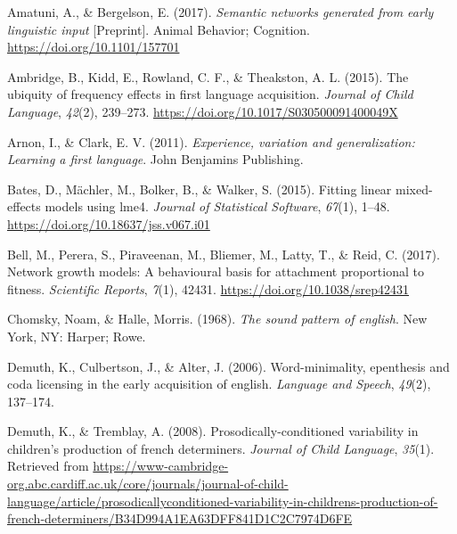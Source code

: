 \documentclass[
  man]{apa6}
\newlength{\cslhangindent}
\newlength{\cslentryspacingunit} %
\newenvironment{CSLReferences}[2] %
 {%
  \setlength{\parindent}{0pt}
  \ifodd #1
  \let\oldpar\par
  \def\par{\hangindent=\cslhangindent\oldpar}
  \fi
  \setlength{\parskip}{#2\cslentryspacingunit}
 }%
 {}
\begin{document}
\hypertarget{refs}{}
\begin{CSLReferences}{1}{0}
\leavevmode{}%
Amatuni, A., \& Bergelson, E. (2017). \emph{Semantic networks generated from early linguistic input} {[}Preprint{]}. Animal Behavior; Cognition. \url{https://doi.org/10.1101/157701}

\leavevmode{}%
Ambridge, B., Kidd, E., Rowland, C. F., \& Theakston, A. L. (2015). The ubiquity of frequency effects in first language acquisition. \emph{Journal of Child Language}, \emph{42}(2), 239--273. \url{https://doi.org/10.1017/S030500091400049X}

\leavevmode{}%
Arnon, I., \& Clark, E. V. (2011). \emph{Experience, variation and generalization: Learning a first language}. John Benjamins Publishing.

\leavevmode{}%
Bates, D., Mächler, M., Bolker, B., \& Walker, S. (2015). Fitting linear mixed-effects models using {lme4}. \emph{Journal of Statistical Software}, \emph{67}(1), 1--48. \url{https://doi.org/10.18637/jss.v067.i01}

\leavevmode{}%
Bell, M., Perera, S., Piraveenan, M., Bliemer, M., Latty, T., \& Reid, C. (2017). Network growth models: A behavioural basis for attachment proportional to fitness. \emph{Scientific Reports}, \emph{7}(1), 42431. \url{https://doi.org/10.1038/srep42431}

\leavevmode{}%
Chomsky, Noam, \& Halle, Morris. (1968). \emph{The sound pattern of english}. New York, {NY}: Harper; Rowe.

\leavevmode{}%
Demuth, K., Culbertson, J., \& Alter, J. (2006). Word-minimality, epenthesis and coda licensing in the early acquisition of english. \emph{Language and Speech}, \emph{49}(2), 137--174.

\leavevmode{}%
Demuth, K., \& Tremblay, A. (2008). Prosodically-conditioned variability in children's production of french determiners. \emph{Journal of Child Language}, \emph{35}(1). Retrieved from \url{https://www-cambridge-org.abc.cardiff.ac.uk/core/journals/journal-of-child-language/article/prosodicallyconditioned-variability-in-childrens-production-of-french-determiners/B34D994A1EA63DFF841D1C2C7974D6FE}


\end{CSLReferences}
\end{document}
